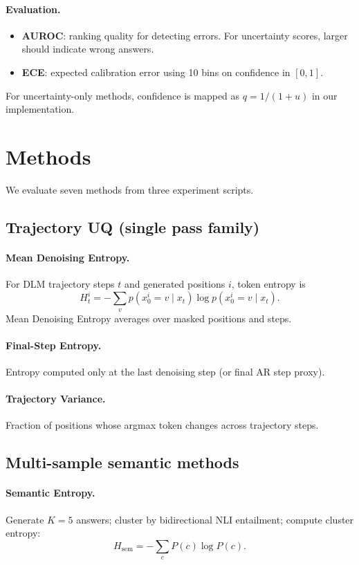 \documentclass{article}
\begin{document}
\paragraph{Evaluation.}
\begin{itemize}
\item \textbf{AUROC}: ranking quality for detecting errors. For uncertainty scores, larger should indicate wrong answers.
\item \textbf{ECE}: expected calibration error using 10 bins on confidence in $[0,1]$.
\end{itemize}
For uncertainty-only methods, confidence is mapped as $q = 1/(1+u)$ in our implementation.

\section{Methods}
We evaluate seven methods from three experiment scripts.

\subsection{Trajectory UQ (single pass family)}
\paragraph{Mean Denoising Entropy.}
For DLM trajectory steps $t$ and generated positions $i$, token entropy is
\begin{equation}
H_t^i = -\sum_v p(x_0^i=v\mid x_t)\log p(x_0^i=v\mid x_t).
\end{equation}
Mean Denoising Entropy averages over masked positions and steps.

\paragraph{Final-Step Entropy.}
Entropy computed only at the last denoising step (or final AR step proxy).

\paragraph{Trajectory Variance.}
Fraction of positions whose argmax token changes across trajectory steps.

\subsection{Multi-sample semantic methods}
\paragraph{Semantic Entropy.}
Generate $K=5$ answers; cluster by bidirectional NLI entailment; compute cluster entropy:
\begin{equation}
H_{\text{sem}} = -\sum_c P(c)\log P(c).
\end{equation}
\end{document}
